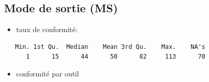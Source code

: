 \documentclass[]{article}
\providecommand{\tightlist}{%
  \setlength{\itemsep}{0pt}\setlength{\parskip}{0pt}}
\begin{document}
\subsection{Mode de sortie (MS)}\label{mode-de-sortie-ms}

\begin{itemize}
\tightlist
\item
  taux de conformité:
\end{itemize}

\begin{verbatim}
   Min. 1st Qu.  Median    Mean 3rd Qu.    Max.    NA's 
      1      15      44      50      82     113      70 
\end{verbatim}

\begin{itemize}
\tightlist
\item
  conformité par outil
\end{itemize}
\end{document}
